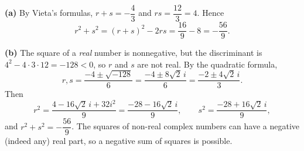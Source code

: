\textbf{(a)} By Vieta's formulas, $r+s=-\dfrac{4}{3}$ and $rs=\dfrac{12}{3}=4$. Hence
\[r^2+s^2=(r+s)^2-2rs=\dfrac{16}{9}-8=\boxed{-\dfrac{56}{9}}.\]

\textbf{(b)} The square of a \emph{real} number is nonnegative, but the discriminant is $4^2-4\cdot3\cdot12=-128<0$, so $r$ and $s$ are not real. By the quadratic formula,
\[r,s=\dfrac{-4\pm\sqrt{-128}}{6}=\dfrac{-4\pm8\sqrt2\,i}{6}=\dfrac{-2\pm4\sqrt2\,i}{3}.\]
Then
\[r^2=\dfrac{4-16\sqrt2\,i+32i^2}{9}=\dfrac{-28-16\sqrt2\,i}{9},\qquad s^2=\dfrac{-28+16\sqrt2\,i}{9},\]
and $r^2+s^2=-\dfrac{56}{9}$. The squares of non-real complex numbers can have a negative (indeed any) real part, so a negative sum of squares is possible.
